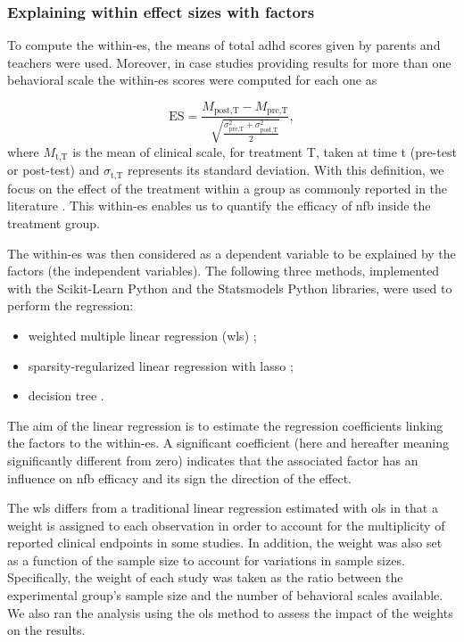 \subsubsection{Explaining within effect sizes with factors}

To compute the within-\gls{es}, the  means of total \gls{adhd} scores given by parents and teachers were used. Moreover, 
in case studies providing results for more than one behavioral scale the within-\gls{es} scores were computed for each one as 

\begin{equation*}
\label{eq:factors_effect_size_within_subject}
\text{ES} = \frac{M_{\text{post,T}} - M_{\text{pre,T}}}{\sqrt{\frac{\sigma_{\text{pre,T}}^2 + \sigma_{\text{post,T}}^2}{2}}},
\end{equation*} 
\noindent where $M_{\text{t,T}}$ is the mean of clinical scale, for treatment T, taken at time t (pre-test or post-test) and $\sigma_{\text{t,T}}$ represents 
its standard deviation. With this definition, we focus on the effect of the treatment within a group \citep{Cohen1988} as commonly reported 
in the literature \citep{Arns2009, Maurizio2014, Strehl2017}. This within-\gls{es} enables us to quantify 
the efficacy of \gls{nfb} inside the treatment group. 

The within-\gls{es} was then considered as a dependent variable to be explained by the factors (the independent variables). 
The following three methods, implemented with the Scikit-Learn Python \citep[version 0.18.1]{Pedregosa2011} and the Statsmodels Python
\citep[version 0.8.0]{Seabold2010} libraries, were used to perform the regression:
\begin{itemize}
  \item weighted multiple linear regression (\gls{wls}) \citep{Montgomery2012};
	\item sparsity-regularized linear regression with \gls{lasso} \citep{Tibshirani1996};
	\item decision tree \citep{Quinlan1986}.
\end{itemize}

The aim of the linear regression is to estimate the regression coefficients linking the factors
to the within-\gls{es}. A significant coefficient (here and hereafter meaning significantly different from zero) indicates
that the associated factor has an influence on \gls{nfb} efficacy and its sign the direction of the effect.

The \gls{wls} differs from a traditional linear regression estimated with \gls{ols} in that a weight is assigned 
to each observation in order to account for the multiplicity of reported clinical endpoints in some studies. In addition, the 
weight was also set as a function of the sample size to account for variations in sample sizes. Specifically, the weight of each study 
was taken as the ratio between the experimental group's sample size and the number of behavioral scales available.
We also ran the analysis using the \gls{ols} method to assess the impact of the weights on the results. 

